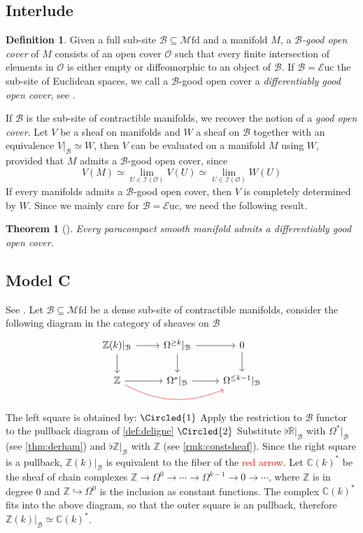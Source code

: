 \documentclass[a4paper]{book}
\newcommand{\lB}{\mathcal{B}}
\newcommand{\bC}{\mathbb{C}}
\newcommand{\lE}{\mathcal{E}}
\newcommand{\lI}{\mathcal{I}}
\newcommand{\lM}{\mathcal{M}}
\newcommand{\rO}{\mathscr{O}}
\newcommand{\bR}{\mathbb{R}}
\newcommand{\bZ}{\mathbb{Z}}
\newcommand{\Euc}{\lE\mathrm{uc}} %
\newcommand{\Mfd}{\lM\mathrm{fd}} %
\newtheorem{theorem}[equation]{Theorem}
\theoremstyle{definition}
\newtheorem{definition}[equation]{Definition}
\theoremstyle{remark}
\numberwithin{equation}{section}
\begin{document}
\subsection{Interlude}\label{int:goodcover}
\begin{definition}
  Given a full sub-site $\lB\subseteq\Mfd$ and a manifold $M$, a $\lB$\emph{-good open cover} of $M$ consists of an open cover $\rO$ such that every finite intersection of elements in $\rO$ is either empty or diffeomorphic to an object of $\lB$. If $\lB=\Euc$ the sub-site of Euclidean spaces, we call a $\lB$-good open cover a \emph{differentiably good open cover}, see \cite[Definition 6.3.9]{fiorenza2011cechcocyclesdifferentialcharacteristic}.
\end{definition}If $\lB$ is the sub-site of contractible manifolds, we recover the notion of a \emph{good open cover}. Let $V$ be a sheaf on manifolds and $W$ a sheaf on $\lB$ together with an equivalence $V|_\lB\simeq W$, then $V$ can be evaluated on a manifold $M$ using $W$, provided that $M$ admits a $\lB$-good open cover, since \[V(M)\simeq\lim_{U\in\lI(\rO)}V(U)\simeq\lim_{U\in\lI(\rO)}W(U)\]
If every manifolds admits a $\lB$-good open cover, then $V$ is completely determined by $W$. Since we mainly care for $\lB=\Euc$, we need the following result. 
\begin{theorem}[{\cite[Theorem A.1]{fiorenza2011cechcocyclesdifferentialcharacteristic}}]
  Every paracompact smooth manifold admits a differentiably good open cover. 
\end{theorem}
\subsection{Model C}\label{mod:C} See {\cite[Lemma 7.3.4]{amabeldebrayhaine2021diffcoh}}. Let $\lB\subseteq\Mfd$ be a dense sub-site of contractible manifolds, consider the following diagram in the category of {sheaves} on $\lB$
\[\begin{tikzcd}
     {\bZ}(k)|_\lB\arrow[d]\arrow[r] & \Omega^{\geq k}|_\lB\arrow[d] \arrow[r] & 0\arrow[d] \\
    \bZ \arrow[r]\arrow[rr,bend right=2.5em,color=red] & \Omega^*|_\lB\arrow[r] & \Omega^{\leq k-1}|_\lB
\end{tikzcd}\] The left square is obtained by: $\Circled{1}$ Apply the restriction to $\lB$ functor to the pullback diagram of \cref{def:deligne} $\Circled{2}$ Substitute $\flat\bR|_\lB$ with $\Omega^*|_\lB$ (see \cref{thm:derham}) and $\flat\bZ|_\lB$ with $\bZ$ (see \cref{rmk:constsheaf}). Since the right square is a pullback, ${\bZ}(k)|_\lB$ is equivalent to the fiber of the \textcolor{red}{red arrow}. Let $\bC(k)^*$ be the sheaf of chain complexes $\bZ\to\Omega^0\to\cdots\to\Omega^{k-1}\to0\to\cdots$, where $\bZ$ is in degree 0 and $\bZ\hookrightarrow\Omega^0$ is the inclusion as constant functions. The complex $\bC(k)^*$ fits into the above diagram, so that the outer square is an pullback, therefore ${\bZ}(k)|_\lB\simeq\bC(k)^*$. 
\end{document}
